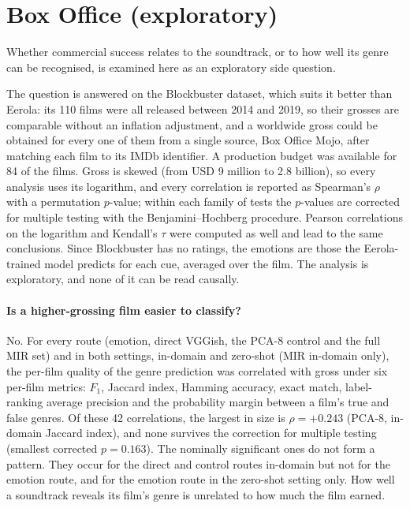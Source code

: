 
\section{Box Office (exploratory)}
\label{sec:eval_boxoffice}

Whether commercial success relates to the soundtrack, or to how well its genre can be
recognised, is examined here as an exploratory side question.

The question is answered on the Blockbuster dataset, which suits it better than Eerola:
its 110 films were all released between 2014 and 2019, so their grosses are comparable
without an inflation adjustment, and a worldwide gross could be obtained for every one of
them from a single source, Box Office Mojo, after matching each film to its IMDb
identifier. A production budget was available for 84 of the films. Gross is skewed
(from USD 9 million to 2.8 billion), so every analysis uses its logarithm, and every
correlation is reported as Spearman's $\rho$ with a permutation $p$-value; within each
family of tests the $p$-values are corrected for multiple testing with the
Benjamini--Hochberg procedure. Pearson correlations on the logarithm and Kendall's $\tau$
were computed as well and lead to the same conclusions. Since Blockbuster has no
ratings, the emotions are those the Eerola-trained model predicts for each cue, averaged
over the film. The analysis is exploratory, and none of it can be read causally.

\paragraph{Is a higher-grossing film easier to classify?} No. For every route (emotion,
direct VGGish, the PCA-8 control and the full MIR set) and in both settings, in-domain
and zero-shot (MIR in-domain only), the per-film quality of the genre prediction was
correlated with gross under six per-film metrics: $F_1$, Jaccard index, Hamming
accuracy, exact match, label-ranking average precision and the probability margin
between a film's true and false genres. Of these 42 correlations, the largest in size is
$\rho=+0.243$ (PCA-8, in-domain Jaccard index), and none survives the correction for multiple
testing (smallest corrected $p=0.163$). The nominally significant ones do not form a
pattern. They occur for the direct and control routes in-domain but not for the emotion
route, and for the emotion route in the zero-shot setting only. How well a soundtrack
reveals its film's genre is unrelated to how much the film earned.

